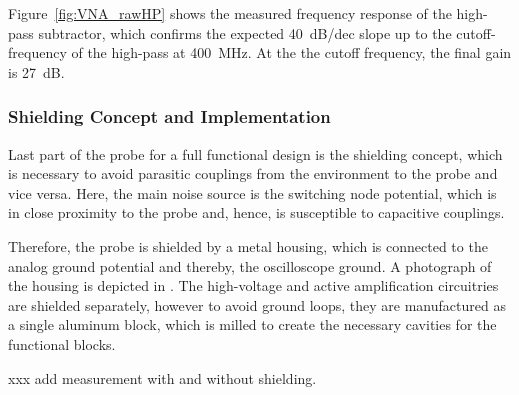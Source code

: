 Figure~\ref{fig:VNA_rawHP} shows the measured frequency response of the high-pass subtractor, which confirms the expected \SI{+40}{dB/dec} slope up to the cutoff-frequency of the high-pass at \SI{400}{MHz}.
At the the cutoff frequency, the final gain is \SI{27}{dB}.

\subsubsection*{Shielding Concept and Implementation}

Last part of the probe for a full functional design is the shielding concept, which is necessary to avoid parasitic couplings from the environment to the probe and vice versa.
Here, the main noise source is the switching node potential, which is in close proximity to the probe and, hence, is susceptible to capacitive couplings.

Therefore, the probe is shielded by a metal housing, which is connected to the analog ground potential and thereby, the oscilloscope ground.
A photograph of the housing is depicted in .
The high-voltage and active amplification circuitries are shielded separately, however to avoid ground loops, they are manufactured as a single aluminum block, which is milled to create the necessary cavities for the functional blocks.


xxx add measurement with and without shielding.

